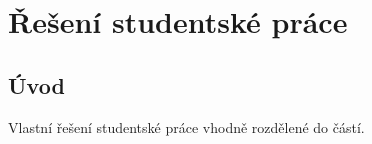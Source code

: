 \chapter{Řešení studentské práce}

\section{Úvod}

Vlastní řešení studentské práce vhodně rozdělené do částí.


